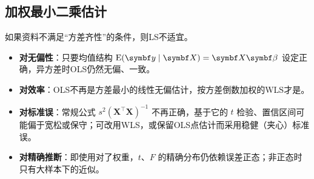 \subsection{加权最小二乘估计}
如果资料不满足“方差齐性”的条件，则LS不适宜。
\begin{itemize}
\item \textbf{对无偏性}：只要均值结构 $\E(\bm y\mid\bm X)=\bm X\bm\beta$ 设定正确，异方差时OLS仍然无偏、一致。
\item \textbf{对效率}：OLS不再是方差最小的线性无偏估计，按方差倒数加权的WLS才是。
\item \textbf{对标准误}：常规公式 $s^2(\bm X^\top\bm X)^{-1}$ 不再正确，基于它的 $t$ 检验、置信区间可能偏于宽松或保守；可改用WLS，或保留OLS点估计而采用稳健（夹心）标准误。
\item \textbf{对精确推断}：即使用对了权重，$t$、$F$ 的精确分布仍依赖误差正态；非正态时只有大样本下的近似。
\end{itemize}
